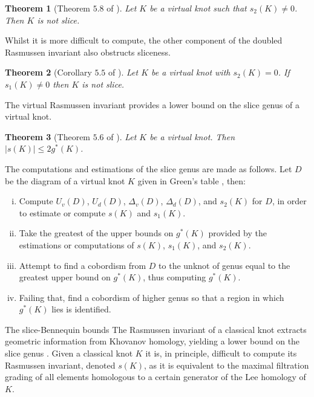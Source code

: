 \documentclass[10pt,oneside]{amsart}
\newtheorem*{theorem*}{Theorem}
\theoremstyle{definition}
\numberwithin{equation}{section}
\begin{document}
\begin{theorem*}[Theorem \( 5.8 \) of \cite{Rushworth2017}]
	Let \( K \) be a virtual knot such that \( s_2 ( K ) \neq 0 \). Then \( K \) is not slice.
\end{theorem*}

Whilst it is more difficult to compute, the other component of the doubled Rasmussen invariant also obstructs sliceness.

\begin{theorem*}[Corollary \(5.5\) of \cite{Rushworth2017}]
	Let \( K \) be a virtual knot with \( s_2 ( K ) = 0 \). If \( s_1 ( K ) \neq 0 \) then \( K \) is not slice.
\end{theorem*}

The virtual Rasmussen invariant provides a lower bound on the slice genus of a virtual knot.

\begin{theorem*}[Theorem \( 5.6 \) of \cite{Dye2014}]
	Let \( K \) be a virtual knot. Then \( | s ( K ) | \leq 2 g^\ast ( K ) \).
\end{theorem*}

The computations and estimations of the slice genus are made as follows. Let \( D \) be the diagram of a virtual knot \( K \) given in Green's table \cite{Green}, then:
\begin{enumerate}[(i)]
	\item Compute \( U_v ( D ) \), \( U_d ( D ) \), \( \Delta_v ( D ) \), \( \Delta_d ( D ) \), and \( s_2 ( K ) \) for \( D \), in order to estimate or compute \( s ( K ) \) and \( s_1 ( K ) \).
	\item Take the greatest of the upper bounds on \( g^\ast ( K ) \) provided by the estimations or computations of \( s ( K ) \), \( s_1 ( K ) \), and \( s_2 ( K ) \).
	\item Attempt to find a cobordism from \( D \) to the unknot of genus equal to the greatest upper bound on \( g^\ast ( K ) \), thus computing \( g^\ast ( K ) \).
	\item Failing that, find a cobordism of higher genus so that a region in which \( g^\ast ( K ) \) lies is identified.
\end{enumerate}

{		{\normalfont\bfseries\large}}{The slice-Bennequin bounds}\label{Subsec:sbbounds}
The Rasmussen invariant of a classical knot extracts geometric information from Khovanov homology, yielding a lower bound on the slice genus \cite{Rasmussen2010}. Given a classical knot \( K \) it is, in principle, difficult to compute its Rasmussen invariant, denoted \( s ( K ) \), as it is equivalent to the maximal filtration grading of all elements homologous to a certain generator of the Lee homology of \( K \).
\end{document}
